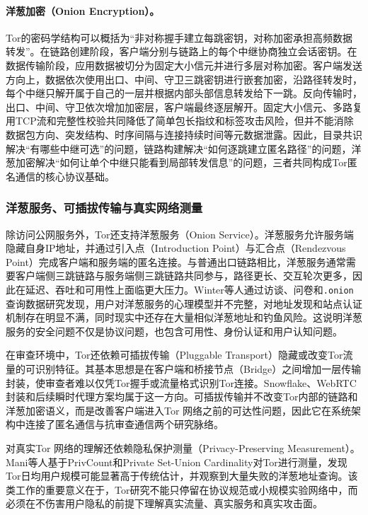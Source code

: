 \paragraph{洋葱加密（Onion Encryption）。}
Tor的密码学结构可以概括为“非对称握手建立每跳密钥，对称加密承担高频数据转发”。在链路创建阶段，客户端分别与链路上的每个中继协商独立会话密钥。在数据传输阶段，应用数据被切分为固定大小信元并进行多层对称加密。客户端发送方向上，数据依次使用出口、中间、守卫三跳密钥进行嵌套加密，沿路径转发时，每个中继只解开属于自己的一层并根据内部头部信息转发给下一跳。反向传输时，出口、中间、守卫依次增加加密层，客户端最终逐层解开。固定大小信元、多路复用TCP流和完整性校验共同降低了简单包长指纹和标签攻击风险，但并不能消除数据包方向、突发结构、时序间隔与连接持续时间等元数据泄露。因此，目录共识解决“有哪些中继可选”的问题，链路构建解决“如何逐跳建立匿名路径”的问题，洋葱加密解决“如何让单个中继只能看到局部转发信息”的问题，三者共同构成Tor匿名通信的核心协议基础。

\subsubsection{洋葱服务、可插拔传输与真实网络测量}

除访问公网服务外，Tor还支持洋葱服务（Onion Service）。洋葱服务允许服务端隐藏自身IP地址，并通过引入点（Introduction Point）与汇合点（Rendezvous Point）完成客户端和服务端的匿名连接。与普通出口链路相比，洋葱服务通常需要客户端侧三跳链路与服务端侧三跳链路共同参与，路径更长、交互轮次更多，因此在延迟、吞吐和可用性上面临更大压力。Winter等人通过访谈、问卷和\texttt{.onion}查询数据研究发现，用户对洋葱服务的心理模型并不完整，对地址发现和站点认证机制存在明显不满，同时现实中还存在大量相似洋葱地址和钓鱼风险\cite{winter2018tor}。这说明洋葱服务的安全问题不仅是协议问题，也包含可用性、身份认证和用户认知问题。

在审查环境中，Tor还依赖可插拔传输（Pluggable Transport）隐藏或改变Tor流量的可识别特征。其基本思想是在客户端和桥接节点（Bridge）之间增加一层传输封装，使审查者难以仅凭Tor握手或流量格式识别Tor连接。Snowflake、WebRTC封装和后续瞬时代理方案均属于这一方向。可插拔传输并不改变Tor内部的链路和洋葱加密语义，而是改善客户端进入Tor 网络之前的可达性问题，因此它在系统架构中连接了匿名通信与抗审查通信两个研究脉络。

对真实Tor 网络的理解还依赖隐私保护测量（Privacy-Preserving Measurement）。Mani等人基于PrivCount和Private Set-Union Cardinality对Tor进行测量，发现Tor日均用户规模可能显著高于传统估计，并观察到大量失败的洋葱地址查询\cite{mani2018understanding}。该类工作的重要意义在于，Tor研究不能只停留在协议规范或小规模实验网络中，而必须在不伤害用户隐私的前提下理解真实流量、真实服务和真实攻击面。

